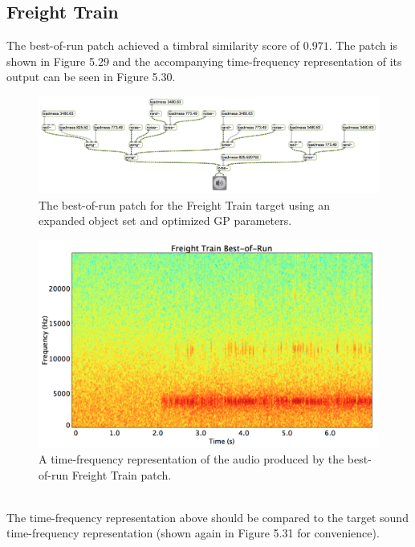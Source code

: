 \documentclass[a4paper,12pt]{report} 	%
\numberwithin{figure}{chapter}
\numberwithin{table}{chapter}
\numberwithin{equation}{chapter}
\begin{document}
\begin{flushleft}
\clearpage
\subsection{Freight Train}

The best-of-run patch achieved a timbral similarity score of $0.971$. The patch is shown in Figure 5.29 and the accompanying time-frequency representation of its output can be seen in Figure 5.30.

\begin{figure}[h!]
\begin{center}
\includegraphics[angle=270, scale=0.50]{FreightTrain_Best}
\caption[Freight Train Best-of-Run Patch]{The best-of-run patch for the Freight Train target using an expanded object set and optimized GP parameters.}
\end{center}
\end{figure}
\begin{figure}[h!]
\begin{center}
\includegraphics[scale=0.35,width=\linewidth]{FreightTrainBestOfRunSTFT}
\caption[Best-of-Run Freight Train Time-Frequency Representation]{A time-frequency representation of the audio produced by the best-of-run Freight Train patch.}
\end{center}
\end{figure}
\\
The time-frequency representation above should be compared to the target sound time-frequency representation (shown again in Figure 5.31 for convenience).

\end{flushleft}
\end{document}
